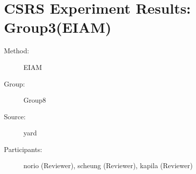 \chapter {CSRS Experiment Results: Group3(EIAM)}	  
\small
	  

\begin{description}
\item [Method:] EIAM
\item [Group:] Group8
\item [Source:] yard
\item [Participants:] norio (Reviewer), scheung (Reviewer), kapila (Reviewer)
\end{description}
